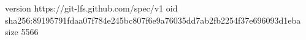 version https://git-lfs.github.com/spec/v1
oid sha256:89195791fdaa07f784e245bc807f6e9a76035dd7ab2fb2254f37e696093d1eba
size 5566
